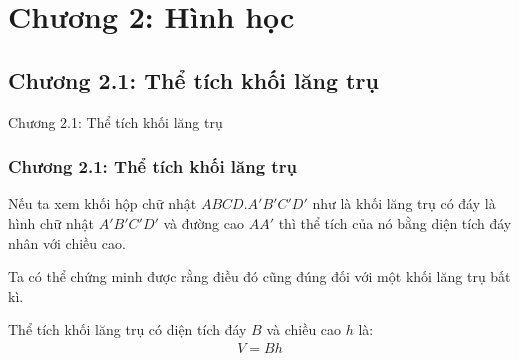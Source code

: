 \section{Chương 2: Hình học}
\subsection{Chương 2.1: Thể tích khối lăng trụ}
\begin{frame}{Chương 2.1: Thể tích khối lăng trụ}
\frametitle{Chương 2.1: Thể tích khối lăng trụ}
Nếu ta xem khối hộp chữ nhật $ABCD.A'B'C'D'$ như là khối lăng trụ có đáy là hình chữ nhật $A'B'C'D'$ và đường cao $AA'$ thì thể tích của nó bằng diện tích đáy nhân với chiều cao.

Ta có thể chứng minh được rằng điều đó cũng đúng đối với một khối lăng trụ bất kì.

Thể tích khối lăng trụ có diện tích đáy $B$ và chiều cao $h$ là:
\begin{eqnarray}
    V = Bh
\end{eqnarray}

\end{frame}

